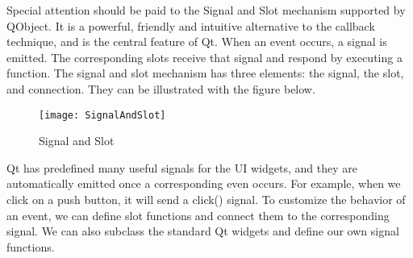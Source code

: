 Special attention should be paid to the Signal and Slot mechanism supported by QObject. It is a powerful, friendly and intuitive alternative to the callback technique, and is the central feature of Qt. When an event occurs, a signal is emitted. The corresponding slots receive that signal and respond by executing a function. The signal and slot mechanism has three elements: the signal, the slot, and connection. They can be illustrated with the figure below.

\begin{figure}[htbp]
\centering
\texttt{[image: SignalAndSlot]}
\caption{Signal and Slot\label{fig:Signal and Slot}}
\end{figure}

Qt has predefined many useful signals for the UI widgets, and they are automatically emitted once a corresponding even occurs. For example, when we click on a push button, it will send a click() signal. To customize the behavior of an event, we can define slot functions and connect them to the corresponding signal. We can also subclass the standard Qt widgets and define our own signal functions.

